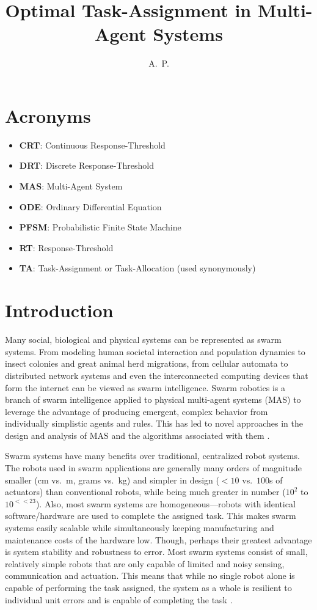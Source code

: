 \documentclass[defaultstyle,12pt]{proposal}
\title{Optimal Task-Assignment in Multi-Agent Systems}
\author{A.~P.}{Kanakia}
\begin{document}
\chapter*{Acronyms}
\begin{itemize}
	\item \textbf{CRT}: Continuous Response-Threshold
	\item \textbf{DRT}: Discrete Response-Threshold
	\item \textbf{MAS}: Multi-Agent System
	\item \textbf{ODE}: Ordinary Differential Equation
	\item \textbf{PFSM}: Probabilistic Finite State Machine
	\item \textbf{RT}: Response-Threshold
	\item \textbf{TA}: Task-Assignment or Task-Allocation (used synonymously)
\end{itemize}

\chapter{Introduction}
Many social, biological and physical systems can be represented as swarm systems. From modeling human societal interaction and population dynamics to insect colonies and great animal herd migrations, from cellular automata to distributed network systems and even the interconnected computing devices that form the internet can be viewed as swarm intelligence. Swarm robotics \cite{Sahin2005} is a branch of swarm intelligence applied to physical multi-agent systems (MAS) to leverage the advantage of producing emergent, complex behavior from individually simplistic agents and rules. This has led to novel approaches in the design and analysis of MAS and the algorithms associated with them \cite{Brambilla2013}.

Swarm systems have many benefits over traditional, centralized robot systems. The robots used in swarm applications are generally many orders of magnitude smaller (cm vs.~m, grams vs.~kg) and simpler in design ($<10$ vs.~$100$s of actuators) than conventional robots, while being much greater in number ($10^2$ to $10^{<<23}$). Also, most swarm systems are homogeneous---robots with identical software/hardware are used to complete the assigned task. This makes swarm systems easily scalable while simultaneously keeping manufacturing and maintenance costs of the hardware low. Though, perhaps their greatest advantage is system stability and robustness to error. Most swarm systems consist of small, relatively simple robots that are only capable of limited and noisy sensing, communication and actuation. This means that while no single robot alone is capable of performing the task assigned, the system as a whole is resilient to individual unit errors and is capable of completing the task \cite{Winfield2005}.
\end{document}
